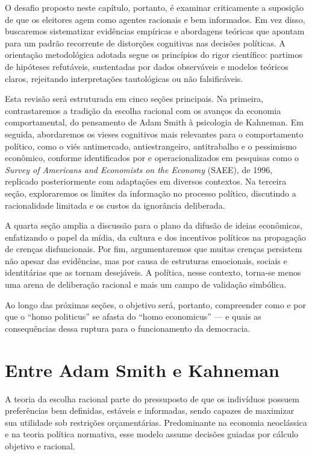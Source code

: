 O desafio proposto neste capítulo, portanto, é examinar criticamente a suposição de que os eleitores agem como agentes racionais e bem informados. Em vez disso, buscaremos sistematizar evidências empíricas e abordagens teóricas que apontam para um padrão recorrente de distorções cognitivas nas decisões políticas. A orientação metodológica adotada segue os princípios do rigor científico: partimos de hipóteses refutáveis, sustentadas por dados observáveis e modelos teóricos claros, rejeitando interpretações tautológicas ou não falsificáveis.

Esta revisão será estruturada em cinco seções principais. Na primeira, contrastaremos a tradição da escolha racional com os avanços da economia comportamental, do pensamento de Adam Smith à psicologia de Kahneman. Em seguida, abordaremos os vieses cognitivos mais relevantes para o comportamento político, como o viés antimercado, antiestrangeiro, antitrabalho e o pessimismo econômico, conforme identificados por  e operacionalizados em pesquisas como o \textit{Survey of Americans and Economists on the Economy} (SAEE), de 1996, replicado posteriormente com adaptações em diversos contextos. Na terceira seção, exploraremos os limites da informação no processo político, discutindo a racionalidade limitada e os custos da ignorância deliberada.

A quarta seção amplia a discussão para o plano da difusão de ideias econômicas, enfatizando o papel da mídia, da cultura e dos incentivos políticos na propagação de crenças disfuncionais. Por fim, argumentaremos que muitas crenças persistem não apesar das evidências, mas por causa de estruturas emocionais, sociais e identitárias que as tornam desejáveis. A política, nesse contexto, torna-se menos uma arena de deliberação racional e mais um campo de validação simbólica.

Ao longo das próximas seções, o objetivo será, portanto, compreender como e por que o ``homo politicus'' se afasta do ``homo economicus'' — e quais as consequências dessa ruptura para o funcionamento da democracia.

\section{Entre Adam Smith e Kahneman} %

A teoria da escolha racional parte do pressuposto de que os indivíduos possuem preferências bem definidas, estáveis e informadas, sendo capazes de maximizar sua utilidade sob restrições orçamentárias. Predominante na economia neoclássica e na teoria política normativa, esse modelo assume decisões guiadas por cálculo objetivo e racional.

